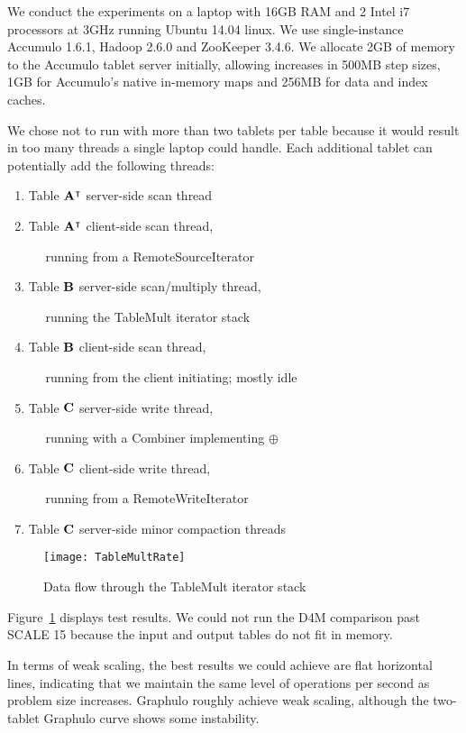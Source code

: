 We conduct the experiments on a laptop with 16GB RAM and 2 Intel i7 processors at 3GHz
running Ubuntu 14.04 linux. We use single-instance Accumulo 1.6.1, Hadoop 2.6.0 and ZooKeeper 3.4.6.
We allocate 2GB of memory to the Accumulo tablet server initially, allowing increases in 500MB step sizes,
1GB for Accumulo's native in-memory maps and 256MB for data and index caches.


We chose not to run with more than two tablets per table because it would result in too many threads 
a single laptop could handle.  Each additional tablet can potentially add the following threads:
\begin{enumerate}
\item Table $\mathbf{A}^{\intercal}$ server-side scan thread
\item Table $\mathbf{A}^{\intercal}$ client-side scan thread,

$\quad$ running from a RemoteSourceIterator
\item Table $\mathbf{B}$ server-side scan/multiply thread,

$\quad$ running the TableMult iterator stack
\item Table $\mathbf{B}$ client-side scan thread, 

$\quad$ running from the client initiating; mostly idle
\item Table $\mathbf{C}$ server-side write thread,

$\quad$ running with a Combiner implementing $\oplus$
\item Table $\mathbf{C}$ client-side write thread,

$\quad$ running from a RemoteWriteIterator
\item Table $\mathbf{C}$ server-side minor compaction threads
\end{enumerate}

\begin{figure}[tbh]
\centering
\texttt{[image: TableMultRate]}
\caption{Data flow through the TableMult iterator stack}
\label{fTableMultPerf}
\end{figure}

Figure~\ref{fTableMultPerf} displays test results.
We could not run the D4M comparison past SCALE 15 because 
the input and output tables do not fit in memory.

In terms of weak scaling, the best results we could achieve are flat horizontal lines, 
indicating that we maintain the same level of operations per second as problem size increases.
Graphulo roughly achieve weak scaling, although the two-tablet Graphulo curve 
shows some instability.

